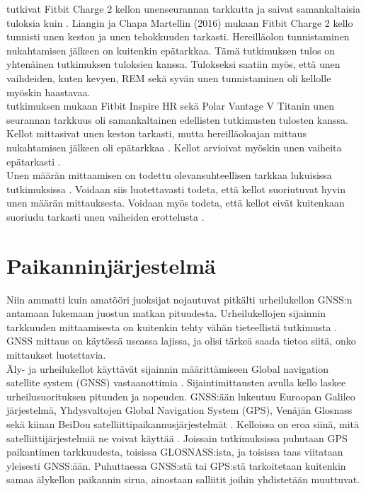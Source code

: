 \documentclass[utf8,bachelor,finnish]{bachelor}
\begin{document}
  \textcite{liang2018validity} tutkivat Fitbit Charge 2 kellon unenseurannan tarkkutta ja saivat samankaltaisia tuloksia
   kuin \textcite{de_zambotti_measures_2016}. Liangin ja Chapa Martellin (2016) mukaan Fitbit Charge 2 kello tunnisti unen keston
    ja unen tehokkuuden tarkasti. Hereilläolon tunnistaminen nukahtamisen jälkeen on kuitenkin
     epätarkkaa. Tämä tutkimuksen tulos on yhtenäinen \textcite{de_zambotti_measures_2016} tutkimuksen tuloksien kanssa.
      Tulokseksi saatiin myös, että unen vaihdeiden, kuten kevyen, REM sekä syvän unen tunnistaminen oli kellolle myöskin haastavaa.\\
  
  \textcite{chinoy_performance_2022} tutkimuksen mukaan Fitbit Inspire HR sekä Polar Vantage V Titanin unen seurannan tarkkuus oli 
    samankaltainen edellisten tutkimusten tulosten kanssa. Kellot mittasivat unen keston tarkasti,
     mutta hereilläoloajan mittaus nukahtamisen jälkeen oli epätarkkaa \parencite{chinoy_performance_2022}.
      Kellot arvioivat myöskin unen vaiheita epätarkasti \parencite{chinoy_performance_2022}.\\
  
  Unen määrän mittaamisen on todettu olevansuhteellisen tarkkaa lukuisissa tutkimuksissa
   \parencite{de_zambotti_measures_2016,liang2018validity,chinoy_performance_2022,miller_validation_2022}. Voidaan siis luotettavasti todeta, että kellot suoriutuvat
    hyvin unen määrän mittauksesta. Voidaan myös todeta, että kellot eivät kuitenkaan suoriudu tarkasti unen vaiheiden erottelusta
     \parencite{chinoy_performance_2022,de_zambotti_measures_2016,liang2018validity}.
       
         
  \section{Paikanninjärjestelmä}
  Niin ammatti kuin amatööri juoksijat nojautuvat pitkälti urheilukellon GNSS:n antamaan lukemaan juostun matkan pituudesta.
  Urheilukellojen sijainnin tarkkuuden mittaamisesta on kuitenkin tehty vähän tieteellistä tutkimusta \parencite{gilgen-ammann_accuracy_2020}.
   GNSS mittaus on käytössä useassa lajissa, ja olisi tärkeä saada tietoa siitä, onko mittaukset luotettavia. \\

  Äly- ja urheilukellot käyttävät sijainnin määrittämiseen Global navigation satellite system (GNSS) vastaanottimia \parencite{gilgen-ammann_accuracy_2020}. 
  Sijaintimittausten avulla kello laskee urheilusuorituksen pituuden ja nopeuden. GNSS:ään lukeutuu Euroopan Galileo järjestelmä, Yhdysvaltojen Global Navigation System (GPS),
   Venäjän Glosnass sekä kiinan BeiDou satelliittipaikannusjärjestelmät \parencite{hofmann2007gnss}.
    Kelloissa on eroa siinä, mitä satelliittijärjestelmiä ne voivat käyttää \parencite{ammann_accuracy_2016}.
     Joissain tutkimuksissa puhutaan GPS paikantimen tarkkuudesta, toisissa GLOSNASS:ista, ja toisissa taas viitataan yleisesti GNSS:ään. Puhuttaessa GNSS:stä tai GPS:stä
      tarkoitetaan kuitenkin samaa älykellon paikannin sirua, ainostaan salliitit joihin yhdistetään muuttuvat.\\
\end{document}
